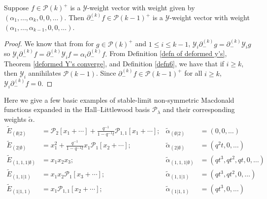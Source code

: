 \documentclass[ALCO,Unicode]{cedram}
\newcommand{\y}{{ \mathscr{Y} }}
\begin{document}
\begin{lemm} \label{weight vectors and lowering}
Suppose $f \in \mathcal{P}(k)^{+}$ is a $\y$-weight vector with weight given by $(\alpha_1,\ldots,\alpha_k,0,0,\ldots)$. Then $\partial_{-}^{(k)} f \in \mathcal{P}(k-1)^{+}$ is a $\y$-weight vector with weight $(\alpha_1,\ldots,\alpha_{k-1},0,0,\ldots)$. 
\end{lemm}

\begin{proof}
We know that from \cite[Section 7, Thm. 7.13, page 36]{Ion_2022} for $g \in \mathcal{P}(k)^{+}$ and $1\leq i \leq k-1$, $\y_i \partial_{-}^{(k)} g = \partial_{-}^{(k)}\y_i g$ so $\y_i\partial_{-}^{(k)} f = \partial_{-}^{(k)}\y_i f = \alpha_i \partial_{-}^{(k)} f.$
From Definition \ref{defn of deformed y's}, Theorem \ref{deformed Y's converge}, and Definition \ref{defn6}, we have that if $i\geq k$, then $\y_i$ annihilates $\mathscr{P}(k-1)$.
Since $\partial_{-}^{(k)}f \in \mathcal{P}(k-1)^{+}$ for all $i \geq k$, $\y_i \partial_{-}^{(k)}f = 0$.
\end{proof}

\begin{exam}
Here we give a few basic examples of stable-limit non-symmetric Macdonald functions expanded in the Hall--Littlewood basis $\mathcal{P}_{\lambda}$ and their corresponding weights $\widetilde\alpha$.
\begin{align*}
      \widetilde{E}_{(\emptyset|2)} &= \mathcal{P}_{2}[x_1+ \cdots] +\frac{q^{-1}}{1-q^{-1}t}\mathcal{P}_{1,1}[x_1+ \cdots]; & %
    \widetilde{\alpha}_{(\emptyset|2)} &= (0,0,\ldots) \\
     \widetilde{E}_{(2|\emptyset)} &= x_1^2 + \frac{q^{-1}}{1-q^{-1}t}x_1 \mathcal{P}_1[x_2+ \cdots]; & %
    \widetilde{\alpha}_{(2|\emptyset)} &= (q^2t,0,\ldots) \\
     \widetilde{E}_{(1,1,1|\emptyset)} &= x_1x_2x_3; & %
    \widetilde{\alpha}_{(1,1,1|\emptyset)} &=(qt^3,qt^2,qt,0,\ldots) \\
     \widetilde{E}_{(1,1|1)} &= x_1x_2\mathcal{P}_1[x_3+ \cdots]; & %
    \widetilde{\alpha}_{(1,1|1)} &= (qt^3,qt^2,0,\ldots) \\
     \widetilde{E}_{(1|1,1)} &= x_1\mathcal{P}_{1,1}[x_2+\cdots]; & %
    \widetilde{\alpha}_{(1|1,1)} &= (qt^3,0,\ldots)
\end{align*}
\end{exam}
\end{document}
